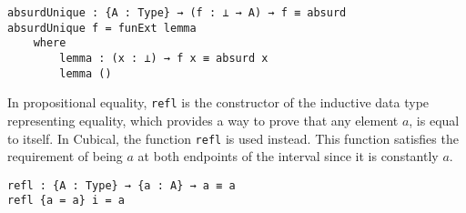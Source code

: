 \begin{verbatim}
absurdUnique : {A : Type} → (f : ⊥ → A) → f ≡ absurd
absurdUnique f = funExt lemma
    where
        lemma : (x : ⊥) → f x ≡ absurd x
        lemma ()
\end{verbatim}

In propositional equality, \texttt{refl} is the constructor of the inductive data type representing equality, which provides a way to prove that any element $a$, is equal to itself. In Cubical, the function \texttt{refl} is used instead. This function satisfies the requirement of being $a$ at both endpoints of the interval since it is constantly $a$. 

\begin{verbatim}
refl : {A : Type} → {a : A} → a ≡ a
refl {a = a} i = a
\end{verbatim}






